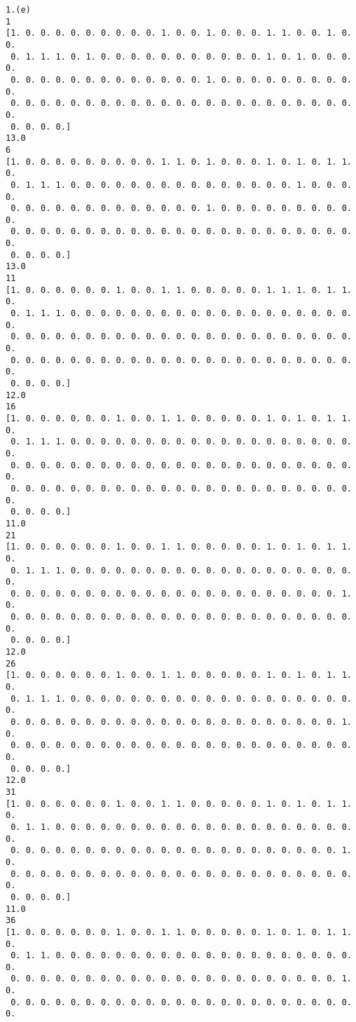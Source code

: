 \documentclass[11pt]{article}
\begin{document}
    \begin{Verbatim}[commandchars=\\\{\}]
1.(e)
1
[1. 0. 0. 0. 0. 0. 0. 0. 0. 0. 1. 0. 0. 1. 0. 0. 0. 1. 1. 0. 0. 1. 0. 0.
 0. 1. 1. 1. 0. 1. 0. 0. 0. 0. 0. 0. 0. 0. 0. 0. 0. 1. 0. 1. 0. 0. 0. 0.
 0. 0. 0. 0. 0. 0. 0. 0. 0. 0. 0. 0. 0. 1. 0. 0. 0. 0. 0. 0. 0. 0. 0. 0.
 0. 0. 0. 0. 0. 0. 0. 0. 0. 0. 0. 0. 0. 0. 0. 0. 0. 0. 0. 0. 0. 0. 0. 0.
 0. 0. 0. 0.]
13.0
6
[1. 0. 0. 0. 0. 0. 0. 0. 0. 0. 1. 1. 0. 1. 0. 0. 0. 1. 0. 1. 0. 1. 1. 0.
 0. 1. 1. 1. 0. 0. 0. 0. 0. 0. 0. 0. 0. 0. 0. 0. 0. 0. 0. 1. 0. 0. 0. 0.
 0. 0. 0. 0. 0. 0. 0. 0. 0. 0. 0. 0. 0. 1. 0. 0. 0. 0. 0. 0. 0. 0. 0. 0.
 0. 0. 0. 0. 0. 0. 0. 0. 0. 0. 0. 0. 0. 0. 0. 0. 0. 0. 0. 0. 0. 0. 0. 0.
 0. 0. 0. 0.]
13.0
11
[1. 0. 0. 0. 0. 0. 0. 1. 0. 0. 1. 1. 0. 0. 0. 0. 0. 1. 1. 1. 0. 1. 1. 0.
 0. 1. 1. 1. 0. 0. 0. 0. 0. 0. 0. 0. 0. 0. 0. 0. 0. 0. 0. 0. 0. 0. 0. 0.
 0. 0. 0. 0. 0. 0. 0. 0. 0. 0. 0. 0. 0. 0. 0. 0. 0. 0. 0. 0. 0. 0. 0. 0.
 0. 0. 0. 0. 0. 0. 0. 0. 0. 0. 0. 0. 0. 0. 0. 0. 0. 0. 0. 0. 0. 0. 0. 0.
 0. 0. 0. 0.]
12.0
16
[1. 0. 0. 0. 0. 0. 0. 1. 0. 0. 1. 1. 0. 0. 0. 0. 0. 1. 0. 1. 0. 1. 1. 0.
 0. 1. 1. 1. 0. 0. 0. 0. 0. 0. 0. 0. 0. 0. 0. 0. 0. 0. 0. 0. 0. 0. 0. 0.
 0. 0. 0. 0. 0. 0. 0. 0. 0. 0. 0. 0. 0. 0. 0. 0. 0. 0. 0. 0. 0. 0. 0. 0.
 0. 0. 0. 0. 0. 0. 0. 0. 0. 0. 0. 0. 0. 0. 0. 0. 0. 0. 0. 0. 0. 0. 0. 0.
 0. 0. 0. 0.]
11.0
21
[1. 0. 0. 0. 0. 0. 0. 1. 0. 0. 1. 1. 0. 0. 0. 0. 0. 1. 0. 1. 0. 1. 1. 0.
 0. 1. 1. 1. 0. 0. 0. 0. 0. 0. 0. 0. 0. 0. 0. 0. 0. 0. 0. 0. 0. 0. 0. 0.
 0. 0. 0. 0. 0. 0. 0. 0. 0. 0. 0. 0. 0. 0. 0. 0. 0. 0. 0. 0. 0. 0. 1. 0.
 0. 0. 0. 0. 0. 0. 0. 0. 0. 0. 0. 0. 0. 0. 0. 0. 0. 0. 0. 0. 0. 0. 0. 0.
 0. 0. 0. 0.]
12.0
26
[1. 0. 0. 0. 0. 0. 0. 1. 0. 0. 1. 1. 0. 0. 0. 0. 0. 1. 0. 1. 0. 1. 1. 0.
 0. 1. 1. 1. 0. 0. 0. 0. 0. 0. 0. 0. 0. 0. 0. 0. 0. 0. 0. 0. 0. 0. 0. 0.
 0. 0. 0. 0. 0. 0. 0. 0. 0. 0. 0. 0. 0. 0. 0. 0. 0. 0. 0. 0. 0. 0. 1. 0.
 0. 0. 0. 0. 0. 0. 0. 0. 0. 0. 0. 0. 0. 0. 0. 0. 0. 0. 0. 0. 0. 0. 0. 0.
 0. 0. 0. 0.]
12.0
31
[1. 0. 0. 0. 0. 0. 0. 1. 0. 0. 1. 1. 0. 0. 0. 0. 0. 1. 0. 1. 0. 1. 1. 0.
 0. 1. 1. 0. 0. 0. 0. 0. 0. 0. 0. 0. 0. 0. 0. 0. 0. 0. 0. 0. 0. 0. 0. 0.
 0. 0. 0. 0. 0. 0. 0. 0. 0. 0. 0. 0. 0. 0. 0. 0. 0. 0. 0. 0. 0. 0. 1. 0.
 0. 0. 0. 0. 0. 0. 0. 0. 0. 0. 0. 0. 0. 0. 0. 0. 0. 0. 0. 0. 0. 0. 0. 0.
 0. 0. 0. 0.]
11.0
36
[1. 0. 0. 0. 0. 0. 0. 1. 0. 0. 1. 1. 0. 0. 0. 0. 0. 1. 0. 1. 0. 1. 1. 0.
 0. 1. 1. 0. 0. 0. 0. 0. 0. 0. 0. 0. 0. 0. 0. 0. 0. 0. 0. 0. 0. 0. 0. 0.
 0. 0. 0. 0. 0. 0. 0. 0. 0. 0. 0. 0. 0. 0. 0. 0. 0. 0. 0. 0. 0. 0. 1. 0.
 0. 0. 0. 0. 0. 0. 0. 0. 0. 0. 0. 0. 0. 0. 0. 0. 0. 0. 0. 0. 0. 0. 0. 0.

\end{Verbatim}
\end{document}
